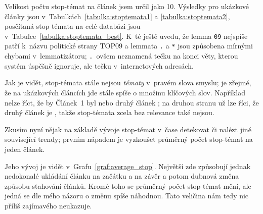 \documentclass[12pt,a4paper]{report}
\begin{document}



Velikost počtu stop-témat na článek jsem určil jako 10. Výsledky pro ukázkové články jsou v~Tabulkách~\ref{tabulka:stoptemata1} a \ref{tabulka:stoptemata2}, posčítaná stop-témata na celé databázi jsou v~Tabulce~\ref{tabulka:stoptemata_best}. K~té ještě uvedu, že lemma \texttt{09} nejspíše patří k~názvu politické strany TOP09 a lemmata \texttt{.} a \texttt{*} jsou způsobena mírnými chybami v~lemmatizátoru; \texttt{.}~ovšem neznamená tečku na konci věty, kterou systém úspěšně ignoruje, ale tečku v~internetových adresách.

Jak je vidět, stop-témata stále nejsou \emph{tématy} v~pravém slova smyslu; je zřejmé, že na ukázkových článcích jde stále spíše o množinu klíčových slov. Například nelze říct, že by Článek~1 byl  nebo druhý článek ; na druhou stranu už lze říci, že druhý článek je , takže stop-témata zcela bez relevance také nejsou.

Zkusím nyní nějak na základě vývoje stop-témat v~čase detekovat  či nalézt jiné související trendy; prvním nápadem je vyzkoušet průměrný počet stop-témat na jeden článek.


Jeho vývoj je vidět v~Grafu~\ref{graf:average_stop}. Největší  zde způsobují jednak nedokonalé ukládání článku na začátku a na závěr a potom dubnová změna způsobu stahování článků. Kromě toho se průměrný počet stop-témat mění, ale jedná se dle mého názoru o změnu spíše náhodnou. Tato veličina nám tedy nic příliš zajímavého neukazuje.
\end{document}

